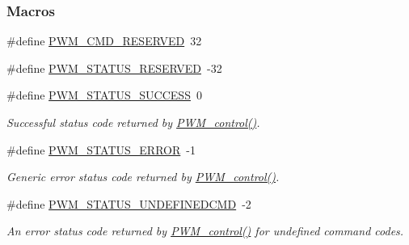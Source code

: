 \subsubsection*{Macros}
\begin{DoxyCompactItemize}
\item 
\#define \hyperlink{_p_w_m_8h_ad731f4db58c72d280900da4be6e3434c}{P\+W\+M\+\_\+\+C\+M\+D\+\_\+\+R\+E\+S\+E\+R\+V\+E\+D}~32
\item 
\#define \hyperlink{_p_w_m_8h_a88616e9288d6e3a4dbab321af26cc04a}{P\+W\+M\+\_\+\+S\+T\+A\+T\+U\+S\+\_\+\+R\+E\+S\+E\+R\+V\+E\+D}~-\/32
\item 
\#define \hyperlink{_p_w_m_8h_a9b234f3cd0bdffc3da5b56a6c4db9563}{P\+W\+M\+\_\+\+S\+T\+A\+T\+U\+S\+\_\+\+S\+U\+C\+C\+E\+S\+S}~0
\begin{DoxyCompactList}\small\item\em Successful status code returned by \hyperlink{_p_w_m_8h_ade999f5b12997479efa1ac85aaf46ef5}{P\+W\+M\+\_\+control()}. \end{DoxyCompactList}\item 
\#define \hyperlink{_p_w_m_8h_a739297dfb10ab4363e7b5db30fdd1ce0}{P\+W\+M\+\_\+\+S\+T\+A\+T\+U\+S\+\_\+\+E\+R\+R\+O\+R}~-\/1
\begin{DoxyCompactList}\small\item\em Generic error status code returned by \hyperlink{_p_w_m_8h_ade999f5b12997479efa1ac85aaf46ef5}{P\+W\+M\+\_\+control()}. \end{DoxyCompactList}\item 
\#define \hyperlink{_p_w_m_8h_afed58384f49ce364218eeaabb0858bea}{P\+W\+M\+\_\+\+S\+T\+A\+T\+U\+S\+\_\+\+U\+N\+D\+E\+F\+I\+N\+E\+D\+C\+M\+D}~-\/2
\begin{DoxyCompactList}\small\item\em An error status code returned by \hyperlink{_p_w_m_8h_ade999f5b12997479efa1ac85aaf46ef5}{P\+W\+M\+\_\+control()} for undefined command codes. \end{DoxyCompactList}\end{DoxyCompactItemize}
